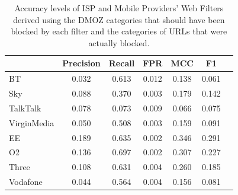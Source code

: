 \documentclass{bmcart}
\begin{document}
\begin{table}[h!]
\caption{Accuracy levels of ISP and Mobile Providers' Web Filters derived using the DMOZ categories that should have been blocked by each filter and the categories of URLs that were actually blocked.}
  \begin{tabular}{ l c c c c c c}
    \hline
     & Precision & Recall & FPR & MCC & F1 \\
    \hline
	BT & 0.032 & 0.613 & 0.012 & 0.138 & 0.061 \\
    Sky & 0.088 & 0.370 & 0.003 & 0.179 & 0.142 \\
    TalkTalk & 0.078  & 0.073 & 0.009 & 0.066 & 0.075 \\
	VirginMedia & 0.050 & 0.508 & 0.003 & 0.159 & 0.091 \\
	\hline    
	EE & 0.189 & 0.635 & 0.002 & 0.346 & 0.291 \\
	O2 & 0.136 & 0.697 & 0.002 & 0.307 & 0.227 \\
	Three & 0.108 & 0.631 & 0.004 & 0.260 & 0.185 \\
	Vodafone & 0.044 & 0.564 & 0.004 & 0.156 & 0.081 \\
    \hline
  \end{tabular}
\end{table}

\end{document}
